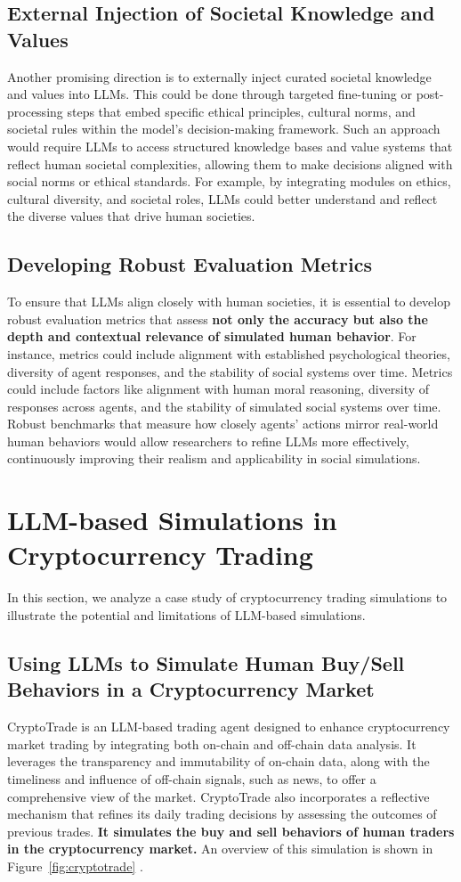 \subsection{External Injection of Societal Knowledge and Values}
Another promising direction is to externally inject curated societal knowledge and values into LLMs. This could be done through targeted fine-tuning or post-processing steps that embed specific ethical principles, cultural norms, and societal rules within the model's decision-making framework. Such an approach would require LLMs to access structured knowledge bases and value systems that reflect human societal complexities, allowing them to make decisions aligned with social norms or ethical standards. For example, by integrating modules on ethics, cultural diversity, and societal roles, LLMs could better understand and reflect the diverse values that drive human societies.

\subsection{Developing Robust Evaluation Metrics}
To ensure that LLMs align closely with human societies, it is essential to develop robust evaluation metrics that assess \textbf{not only the accuracy but also the depth and contextual relevance of simulated human behavior}. For instance, metrics could include alignment with established psychological theories, diversity of agent responses, and the stability of social systems over time. Metrics could include factors like alignment with human moral reasoning, diversity of responses across agents, and the stability of simulated social systems over time. Robust benchmarks that measure how closely agents' actions mirror real-world human behaviors would allow researchers to refine LLMs more effectively, continuously improving their realism and applicability in social simulations.

\section{LLM-based Simulations in Cryptocurrency Trading}
In this section, we analyze a case study of cryptocurrency trading simulations to illustrate the potential and limitations of LLM-based simulations.

\subsection{Using LLMs to Simulate Human Buy/Sell Behaviors in a Cryptocurrency Market}
CryptoTrade is an LLM-based trading agent designed to enhance cryptocurrency market trading by integrating both on-chain and off-chain data analysis. It leverages the transparency and immutability of on-chain data, along with the timeliness and influence of off-chain signals, such as news, to offer a comprehensive view of the market. CryptoTrade also incorporates a reflective mechanism that refines its daily trading decisions by assessing the outcomes of previous trades. \textbf{It simulates the buy and sell behaviors of human traders in the cryptocurrency market.} An overview of this simulation is shown in Figure~\ref{fig:cryptotrade} \citep{li2024cryptotrade}.

